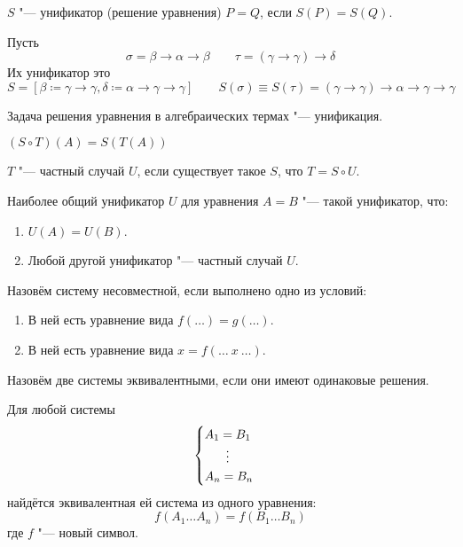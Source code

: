 \begin{definition}[унификатор] \label{unificator}
    $S$ "--- унификатор (решение уравнения) $P=Q$, если $S(P)=S(Q)$.
\end{definition}
\begin{example}
    Пусть
    \[
        \sigma = \beta\to\alpha\to\beta \qquad \tau = (\gamma\to\gamma)\to\delta
    \]
    Их унификатор это
    \[
        S = [\beta \coloneqq \gamma\to\gamma, \delta \coloneqq \alpha\to\gamma\to\gamma]
        \qquad S(\sigma) \equiv S(\tau) = (\gamma\to\gamma)\to\alpha\to\gamma\to\gamma
    \]
\end{example}
Задача решения уравнения в алгебраических термах "--- унификация.

\begin{definition}[композиция]
    $(S \circ T)(A) = S(T(A))$
\end{definition}

\begin{definition}
    $T$ "--- частный случай $U$, если существует такое $S$, что $T = S \circ U$.
\end{definition}

\begin{definition}
    Наиболее общий унификатор $U$ для уравнения $A=B$ "--- такой унификатор, что:
    \begin{enumerate}
        \item $U(A)=U(B)$.
        \item Любой другой унификатор "--- частный случай $U$.
    \end{enumerate}
\end{definition}

\begin{definition}
    Назовём систему несовместной, если выполнено одно из условий:
    \begin{enumerate}
        \item В ней есть уравнение вида $f(\ldots)=g(\ldots)$.
        \item В ней есть уравнение вида $x = f(\ldots~x~\ldots)$.
    \end{enumerate}
\end{definition}

\begin{definition}
    Назовём две системы эквивалентными, если они имеют одинаковые решения.
\end{definition}

\begin{statement}
    Для любой системы
    \[
        \begin{cases}
            A_1 = B_1 \\
            \phantom{A_1} \mathrel{\makebox[\widthof{=}]{\vdots}} \\
            A_n = B_n
        \end{cases}
    \]
    найдётся эквивалентная ей система из одного уравнения:
    \[
        f(A_1 \ldots A_n) = f(B_1 \ldots B_n)
    \]
    где $f$ "--- новый символ.
\end{statement}

